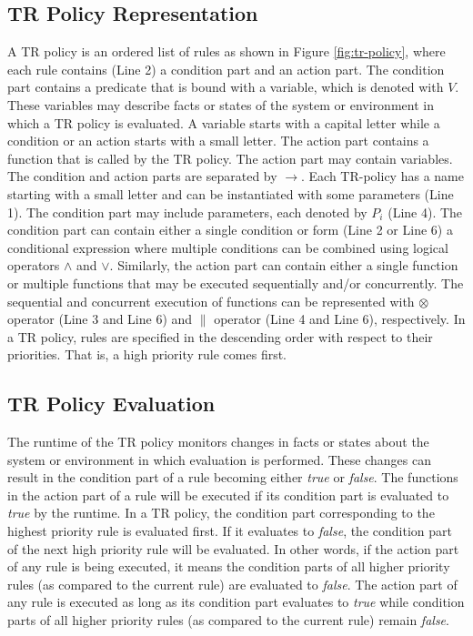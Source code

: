 \documentclass[10pt, conference, compsocconf]{IEEEtran}
\begin{document}
\subsection{TR Policy Representation}
A TR policy is an ordered list of rules as shown in Figure \ref{fig:tr-policy}, where each rule contains (Line 2) a condition part and an action part. The condition part contains a predicate that is bound with a variable, which is denoted with $V$. These variables may describe facts or states of the system or environment in which a TR policy is evaluated. A variable starts with a capital letter while a condition or an action starts with a small letter. The action part contains a function that is called by the TR policy. The action part may contain variables. The condition and action parts are separated by $\rightarrow$. Each TR-policy has a name starting with a small letter and can be instantiated with some parameters (Line 1). The condition part may include parameters, each denoted by $P_i$ (Line 4). The condition part can contain either a single condition or form (Line 2 or Line 6) a conditional expression where multiple conditions can be combined using logical operators $\wedge$ and $\vee$. Similarly, the action part can contain either a single function or multiple functions that may be executed sequentially and/or concurrently. The sequential and concurrent execution of functions can be represented with $\otimes$ operator (Line 3 and Line 6) and $\parallel$ operator (Line 4 and Line 6), respectively. In a TR policy, rules are specified in the descending order with respect to their priorities. That is, a high priority rule comes first.

\subsection{TR Policy Evaluation}
The runtime of the TR policy monitors changes in facts or states about the system or environment in which evaluation is performed. These changes can result in the condition part of a rule becoming either \emph{true} or \emph{false}. The functions in the action part of a rule will be executed if its condition part is evaluated to \emph{true} by the runtime. In a TR policy, the condition part corresponding to the highest priority rule is evaluated first. If it evaluates to \emph{false}, the condition part of the next high priority rule will be evaluated. In other words, if the action part of any rule is being executed, it means the condition parts of all higher priority rules (as compared to the current rule) are evaluated to \emph{false}. The action part of any rule is executed as long as its condition part evaluates to \emph{true} while condition parts of all higher priority rules (as compared to the current rule) remain \emph{false}.
\end{document}
